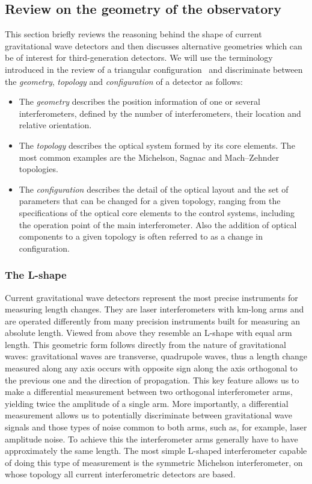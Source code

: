 \FloatBarrier
\subsection{Review on the geometry of the observatory}\label{sec:georeview}

This section briefly reviews the reasoning behind the shape of current gravitational wave detectors and then
discusses alternative geometries which can be of interest for third-generation detectors. We
will use the terminology introduced in the review of a triangular configuration~\cite{Freise2009} and
discriminate between the
\emph{geometry}, \emph{topology} and \emph{configuration} of a detector as follows:
\begin{itemize}
\item The \emph{geometry} describes the position information of one or several interferometers,
defined by the number of interferometers, their location and relative orientation.
\item The \emph{topology} describes the optical system formed by its core elements.
The most common examples are the Michelson, Sagnac and Mach--Zehnder topologies.
\item The \emph{configuration} describes the detail of the optical layout and the set of parameters that
can be changed for a given topology, ranging from the specifications of the optical core
elements to the control systems, including the operation point of the
main interferometer. Also the
addition of optical components to a given topology is often referred to as a change in configuration.
\end{itemize}

\FloatBarrier
\subsubsection{The L-shape}
\label{sec:lshape}
Current gravitational wave detectors represent the most precise instruments for measuring length changes.
They are laser interferometers with km-long arms and are operated differently from many precision
instruments built for measuring an absolute length. Viewed from above
they resemble an L-shape with equal arm length.
This geometric form follows directly from the nature of gravitational
waves: gravitational waves are transverse, quadrupole waves, thus a length change measured along any axis
occurs with opposite sign along the axis orthogonal to the previous one and the direction of propagation.
This key feature allows us to make a differential measurement between two orthogonal interferometer
arms, yielding twice the amplitude of a single arm. More importantly, a differential measurement allows us to
potentially discriminate between gravitational wave signals and those types of noise common to both arms, such as,
for example, laser amplitude noise. To achieve this the interferometer arms generally have to have approximately
the same length. The most simple L-shaped interferometer capable of doing this type
of measurement is the symmetric Michelson interferometer, on whose topology all current interferometric detectors
are based.


